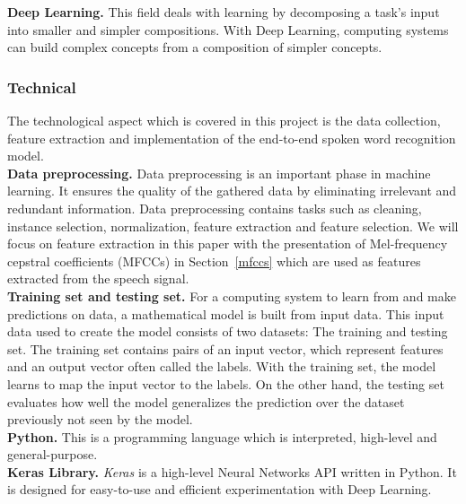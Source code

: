 \textbf{Deep Learning.} This field deals with learning by decomposing a task's
input into smaller and simpler compositions. With Deep Learning, computing
systems can build complex concepts from a composition of simpler concepts.

\subsubsection{Technical} The technological aspect which is covered in this
project is the data collection, feature extraction and implementation of the
end-to-end spoken word recognition model. \\

\textbf{Data preprocessing.} Data preprocessing is an important phase in machine
learning. It ensures the quality of the gathered data by eliminating irrelevant
and redundant information. Data preprocessing contains tasks such as cleaning,
instance selection, normalization, feature extraction and feature selection. We
will focus on feature extraction in this paper with the presentation of
Mel-frequency cepstral coefficients (MFCCs) in Section~\ref{mfccs} which are
used as features extracted from the speech signal.\\


\textbf{Training set and testing set.} For a computing system to learn from and
make predictions on data, a mathematical model is built from input data. This
input data used to create the model consists of two datasets: The training and
testing set. The training set contains pairs of an input vector, which represent
features and an output vector often called the labels. With the training set,
the model learns to map the input vector to the labels. On the other hand, the
testing set evaluates how well the model generalizes the prediction over the
dataset previously not seen by the model.\\

\textbf{Python.} This is a programming language which is interpreted, high-level
and general-purpose.~\cite{Python}\\

\textbf{Keras Library.} \textit{Keras} is a high-level Neural Networks API
written in Python. It is designed for easy-to-use and efficient experimentation
with Deep Learning.~\cite{chollet2015keras}
